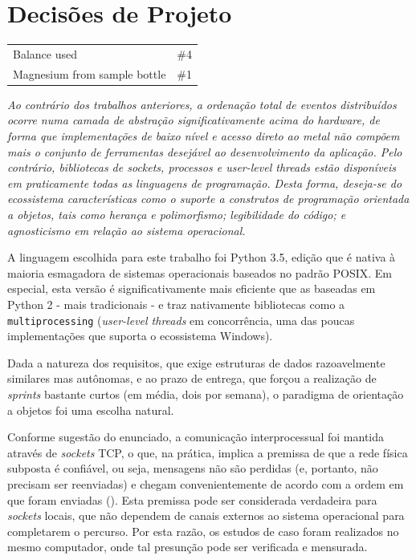 \documentclass[a4paper,12pt]{article}
\begin{document}
        
        \section{Decisões de Projeto}
        
            \begin{tabular}{ll}
                Balance used & \#4\\
                Magnesium from sample bottle & \#1\\
            \end{tabular}

            \em{}Ao contrário dos trabalhos anteriores, a ordenação total de eventos distribuídos ocorre numa camada de abstração significativamente acima do hardware, de forma que implementações de baixo nível e acesso direto ao metal não compõem mais o conjunto de ferramentas desejável ao desenvolvimento da aplicação.
            Pelo contrário, bibliotecas de \emph{sockets}, processos e \emph{user-level threads} estão disponíveis em praticamente todas as linguagens de programação.
            Desta forma, deseja-se do ecossistema características como o suporte a construtos de programação orientada a objetos, tais como herança e polimorfismo; legibilidade do código; e agnosticismo em relação ao sistema operacional.
            
            A linguagem escolhida para este trabalho foi Python 3.5, edição que é nativa à maioria esmagadora de sistemas operacionais baseados no padrão POSIX.
            Em especial, esta versão é significativamente mais eficiente que as baseadas em Python 2 - mais tradicionais - e traz nativamente bibliotecas como a \texttt{multiprocessing}\cite{WEBSITE:8} (\emph{user-level threads} em concorrência, uma das poucas implementações que suporta o ecossistema Windows).
            
            Dada a natureza dos requisitos, que exige estruturas de dados razoavelmente similares mas autônomas, e ao prazo de entrega, que forçou a realização de \emph{sprints} bastante curtos (em média, dois por semana), o paradigma de orientação a objetos foi uma escolha natural.

            Conforme sugestão do enunciado, a comunicação interprocessual foi mantida através de \emph{sockets} TCP, o que, na prática, implica a premissa de que a rede física subposta é confiável, ou seja, mensagens não são perdidas (e, portanto, não precisam ser reenviadas) e chegam convenientemente de acordo com a ordem em que foram enviadas (\cite{BOOK:1}).
            Esta premissa pode ser considerada verdadeira para \emph{sockets} locais, que não dependem de canais externos ao sistema operacional para completarem o percurso.
            Por esta razão, os estudos de caso foram realizados no mesmo computador, onde tal presunção pode ser verificada e mensurada.
\end{document}
